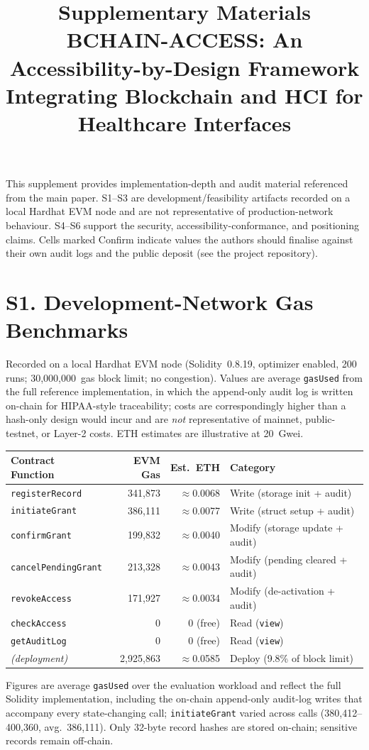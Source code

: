 \documentclass[10pt]{article}
\title{\textbf{Supplementary Materials}\\[3pt]\large BCHAIN-ACCESS: An Accessibility-by-Design Framework Integrating Blockchain and HCI for Healthcare Interfaces}
\date{}
\newcommand{\conf}{\textcolor{orange!80!black}{Confirm}}
\begin{document}
\maketitle
\noindent This supplement provides implementation-depth and audit material referenced from the main
paper. S1--S3 are development/feasibility artifacts recorded on a local Hardhat EVM node and are not
representative of production-network behaviour. S4--S6 support the security, accessibility-conformance,
and positioning claims. Cells marked \conf{} indicate values the authors should finalise against their
own audit logs and the public deposit (see the project repository).

\section*{S1. Development-Network Gas Benchmarks}
Recorded on a local Hardhat EVM node (Solidity~0.8.19, optimizer enabled, 200 runs; 30{,}000{,}000~gas block limit; no congestion). Values are average \texttt{gasUsed} from the full reference implementation, in which the append-only audit log is written on-chain for HIPAA-style traceability; costs are correspondingly higher than a hash-only design would incur and are \emph{not} representative of mainnet, public-testnet, or Layer-2 costs. ETH estimates are illustrative at 20~Gwei.
\begin{center}\small\begin{tabular}{|l|r|r|l|}
\hline\textbf{Contract Function} & \textbf{EVM Gas} & \textbf{Est.\ ETH} & \textbf{Category}\\\hline
\texttt{registerRecord} & 341{,}873 & $\approx$0.0068 & Write (storage init + audit)\\\hline
\texttt{initiateGrant} & 386{,}111 & $\approx$0.0077 & Write (struct setup + audit)\\\hline
\texttt{confirmGrant} & 199{,}832 & $\approx$0.0040 & Modify (storage update + audit)\\\hline
\texttt{cancelPendingGrant} & 213{,}328 & $\approx$0.0043 & Modify (pending cleared + audit)\\\hline
\texttt{revokeAccess} & 171{,}927 & $\approx$0.0034 & Modify (de-activation + audit)\\\hline
\texttt{checkAccess} & 0 & 0 (free) & Read (\texttt{view})\\\hline
\texttt{getAuditLog} & 0 & 0 (free) & Read (\texttt{view})\\\hline
\textit{(deployment)} & 2{,}925{,}863 & $\approx$0.0585 & Deploy (9.8\% of block limit)\\\hline
\end{tabular}\end{center}
{\footnotesize Figures are average \texttt{gasUsed} over the evaluation workload and reflect the full Solidity implementation, including the on-chain append-only audit-log writes that accompany every state-changing call; \texttt{initiateGrant} varied across calls (380{,}412--400{,}360, avg.\ 386{,}111). Only 32-byte record hashes are stored on-chain; sensitive records remain off-chain.}
\end{document}
